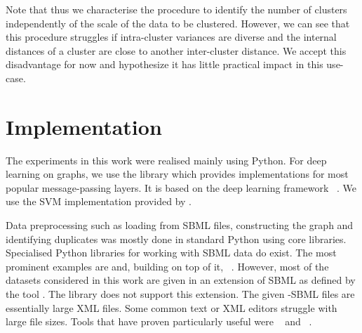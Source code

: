 \documentclass[
	fontsize=10pt, %
	twoside=true, %
	secnumdepth=1, %
  toc=indentunnumbered %
]{kaobook}
\begin{document}
Note that thus we characterise the procedure to identify the number of clusters
independently of the scale of the data to be clustered. However, we can see that this
procedure struggles if intra-cluster variances are diverse and the internal
distances of a cluster are close to another inter-cluster distance. We accept
this disadvantage for now and hypothesize it has little practical impact in this
use-case.



\section{Implementation}

The experiments in this work were realised mainly using Python. For deep
learning on graphs, we use the library 
\cite{fey_FastGraphRepresentation_2019} which provides implementations for most
popular message-passing layers. It is based on the deep learning framework
~\cite{paszke_PyTorchImperativeStyle_2019}. We use the SVM
implementation provided by 
\cite{pedregosa_ScikitlearnMachineLearning_}.

Data preprocessing such as loading from SBML files, constructing the graph and
identifying duplicates was mostly done in standard Python using core libraries.
Specialised Python libraries for working with SBML data do exist. The most
prominent examples are 
\cite{bornstein_LibSBMLAPILibrary_2008} and, building on top of it,
~\cite{ebrahim_COBRApyCOnstraintsBasedReconstruction_2013}.
However, most of the datasets considered in this work are given in an extension
of SBML as defined by the tool . The 
library does not support this extension.
The given -SBML files are essentially large XML files.
Some common text or XML editors struggle with large file sizes. Tools that
have proven particularly useful were
~\cite{_XMLExplorer_2021} and ~\cite{_GNUEmacsGNU_}.
\end{document}

